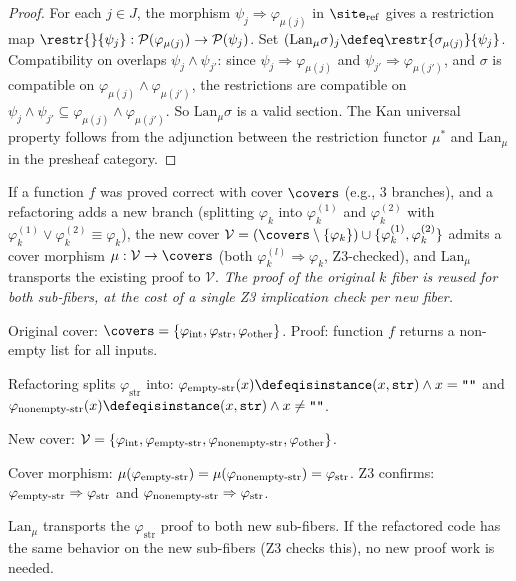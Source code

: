 \begin{proof}
For each $j \in J$, the morphism $\psi_j \Rightarrow \varphi_{\mu(j)}$ in
$\site_{\mathrm{ref}}$ gives a restriction map
$\restr{}{\psi_j} : \mathcal{P}(\varphi_{\mu(j)}) \to \mathcal{P}(\psi_j)$.
Set $(\mathrm{Lan}_\mu \sigma)_j \defeq \restr{\sigma_{\mu(j)}}{\psi_j}$.
Compatibility on overlaps $\psi_j \wedge \psi_{j'}$: since
$\psi_j \Rightarrow \varphi_{\mu(j)}$ and $\psi_{j'} \Rightarrow
\varphi_{\mu(j')}$, and $\sigma$ is compatible on $\varphi_{\mu(j)}
\wedge \varphi_{\mu(j')}$, the restrictions are compatible on
$\psi_j \wedge \psi_{j'} \subseteq \varphi_{\mu(j)} \wedge
\varphi_{\mu(j')}$.  So $\mathrm{Lan}_\mu \sigma$ is a valid section.
The Kan universal property follows from the adjunction between the
restriction functor $\mu^*$ and $\mathrm{Lan}_\mu$ in the presheaf category.
\end{proof}

\begin{corollary}
\label{cor:refactoring-proof}
If a function $f$ was proved correct with cover $\covers$ (e.g., 3 branches),
and a refactoring adds a new branch (splitting $\varphi_k$ into
$\varphi_k^{(1)}$ and $\varphi_k^{(2)}$ with $\varphi_k^{(1)} \vee
\varphi_k^{(2)} \equiv \varphi_k$), the new cover
$\mathcal{V} = (\covers \setminus \{\varphi_k\}) \cup
\{\varphi_k^{(1)}, \varphi_k^{(2)}\}$
admits a cover morphism $\mu : \mathcal{V} \to \covers$ (both
$\varphi_k^{(l)} \Rightarrow \varphi_k$, Z3-checked), and
$\mathrm{Lan}_\mu$ transports the existing proof to $\mathcal{V}$.
\emph{The proof of the original $k$ fiber is reused for both sub-fibers,
at the cost of a single Z3 implication check per new fiber.}
\end{corollary}

\begin{example}
\label{ex:kan-refactoring}
Original cover: $\covers = \{\varphi_{\mathrm{int}}, \varphi_{\mathrm{str}},
\varphi_{\mathrm{other}}\}$.  Proof: function $f$ returns a non-empty list
for all inputs.

Refactoring splits $\varphi_{\mathrm{str}}$ into:
$\varphi_{\mathrm{empty\mathchar`-str}}(x) \defeq \mathtt{isinstance}(x,\mathtt{str})
\wedge x = \texttt{""}$
and $\varphi_{\mathrm{nonempty\mathchar`-str}}(x) \defeq
\mathtt{isinstance}(x,\mathtt{str}) \wedge x \ne \texttt{""}$.

New cover: $\mathcal{V} = \{\varphi_{\mathrm{int}},
\varphi_{\mathrm{empty\mathchar`-str}},
\varphi_{\mathrm{nonempty\mathchar`-str}},
\varphi_{\mathrm{other}}\}$.

Cover morphism: $\mu(\varphi_{\mathrm{empty\mathchar`-str}}) =
\mu(\varphi_{\mathrm{nonempty\mathchar`-str}}) = \varphi_{\mathrm{str}}$.
Z3 confirms:
$\varphi_{\mathrm{empty\mathchar`-str}} \Rightarrow \varphi_{\mathrm{str}}$
and $\varphi_{\mathrm{nonempty\mathchar`-str}} \Rightarrow \varphi_{\mathrm{str}}$.

$\mathrm{Lan}_\mu$ transports the $\varphi_{\mathrm{str}}$ proof to both
new sub-fibers.  If the refactored code has the same behavior on the new
sub-fibers (Z3 checks this), no new proof work is needed.
\end{example}


